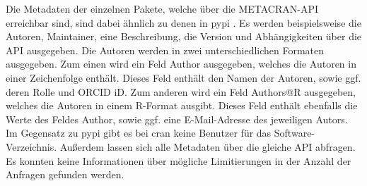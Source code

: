 Die Metadaten der einzelnen Pakete, welche über die METACRAN-API erreichbar sind, sind dabei ähnlich zu denen in \gls{pypi} \autocite{csardi_pkgsearch_2023}.
Es werden beispielsweise die Autoren, Maintainer, eine Beschreibung, die Version und Abhängigkeiten über die API ausgegeben.
Die Autoren werden in zwei unterschiedlichen Formaten ausgegeben.
Zum einen wird ein Feld \glqq Author\grqq{} ausgegeben, welches die Autoren in einer Zeichenfolge enthält.
Dieses Feld enthält den Namen der Autoren, sowie ggf. deren Rolle und ORCID iD.
Zum anderen wird ein Feld \glqq Authors@R\grqq{} ausgegeben, welches die Autoren in einem R-Format ausgibt.
Dieses Feld enthält ebenfalls die Werte des Feldes \glqq Author\grqq{}, sowie ggf. eine E-Mail-Adresse des jeweiligen Autors. 
Im Gegensatz zu \gls{pypi} gibt es bei \gls{cran} keine Benutzer für das Software-Verzeichnis.
Außerdem lassen sich alle Metadaten über die gleiche API abfragen.
Es konnten keine Informationen über mögliche Limitierungen in der Anzahl der Anfragen gefunden werden.
